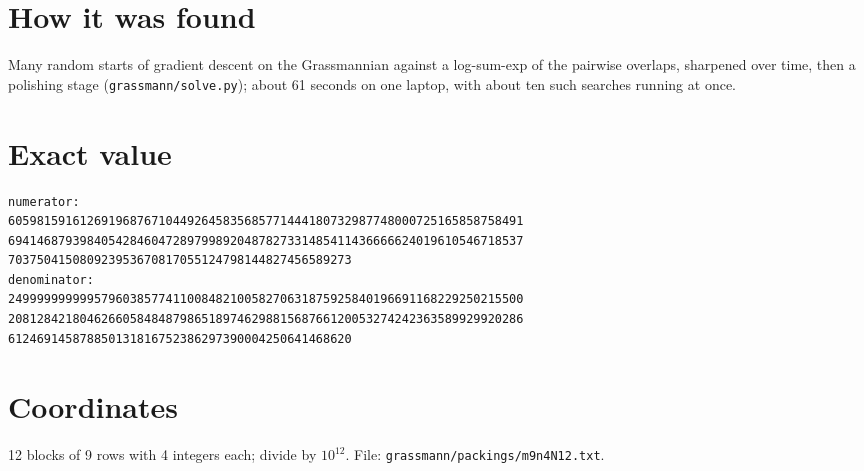 \documentclass[11pt,a4paper]{article}
\begin{document}
\section{How it was found}
Many random starts of gradient descent on the Grassmannian against a log-sum-exp of the pairwise overlaps, sharpened over time, then a polishing stage (\texttt{grassmann/solve.py}); about 61 seconds on one laptop, with about ten such searches running at once.


\appendix
\section{Exact value}
{\small
\begin{verbatim}
numerator:
605981591612691968767104492645835685771444180732987748000725165858758491
694146879398405428460472897998920487827331485411436666624019610546718537
703750415080923953670817055124798144827456589273
denominator:
249999999999579603857741100848210058270631875925840196691168229250215500
208128421804626605848487986518974629881568766120053274242363589929920286
612469145878850131816752386297390004250641468620
\end{verbatim}}

\section{Coordinates}
12 blocks of 9 rows with 4 integers each; divide by $10^{12}$. File: \texttt{grassmann/packings/m9n4N12.txt}.
{\tiny
\begin{multicols}{3}
\end{multicols}}
\end{document}
